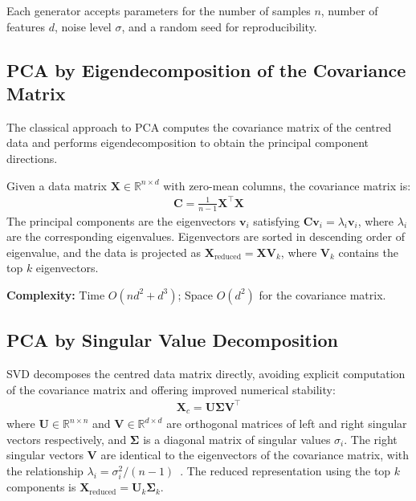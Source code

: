 Each generator accepts parameters for the number of samples $n$, number of features $d$, noise level $\sigma$, and a random seed for reproducibility.

\subsection{PCA by Eigendecomposition of the Covariance Matrix}

The classical approach to PCA computes the covariance matrix of the centred
data and performs eigendecomposition to obtain the principal component
directions.

Given a data matrix $\mathbf{X} \in \mathbb{R}^{n \times d}$ with zero-mean
columns, the covariance matrix is:
\begin{align}
    \mathbf{C} = \frac{1}{n-1} \mathbf{X}^\top \mathbf{X} \label{eq:cov}
\end{align}
The principal components are the eigenvectors $\mathbf{v}_i$ satisfying
$\mathbf{C}\mathbf{v}_i = \lambda_i \mathbf{v}_i$, where $\lambda_i$ are
the corresponding eigenvalues. Eigenvectors are sorted in descending order
of eigenvalue, and the data is projected as
$\mathbf{X}_{\text{reduced}} = \mathbf{X}\mathbf{V}_k$, where
$\mathbf{V}_k$ contains the top $k$ eigenvectors.

\textbf{Complexity:} Time $O(nd^2 + d^3)$; Space $O(d^2)$ for the covariance
matrix.

\subsection{PCA by Singular Value Decomposition}

SVD decomposes the centred data matrix directly, avoiding explicit computation
of the covariance matrix and offering improved numerical stability:
\begin{align}
    \mathbf{X}_c = \mathbf{U} \boldsymbol{\Sigma} \mathbf{V}^\top \label{eq:svd}
\end{align}
where $\mathbf{U} \in \mathbb{R}^{n \times n}$ and
$\mathbf{V} \in \mathbb{R}^{d \times d}$ are orthogonal matrices of left and
right singular vectors respectively, and $\boldsymbol{\Sigma}$ is a diagonal
matrix of singular values $\sigma_i$. The right singular vectors $\mathbf{V}$
are identical to the eigenvectors of the covariance matrix, with the
relationship $\lambda_i = \sigma_i^2 / (n-1)$~\citep{greenacre_pca_2022}.
The reduced representation using the top $k$ components is
$\mathbf{X}_{\text{reduced}} = \mathbf{U}_k \boldsymbol{\Sigma}_k$.

